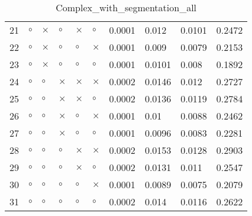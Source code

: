 \begin{table}[H]
\begin{tabular}{|P{0.7cm}|P{1.3cm}P{1.3cm}P{1.3cm}P{1.3cm}P{1.3cm}|P{1.1cm}P{1.1cm}P{1.1cm}P{1.1cm}|}
  21 &  $\circ$ & $\times$ &  $\circ$ &     $\times$ &     $\circ$ &       0.0001 &           0.012 &          0.0101 &          0.2472 \\
  22 &  $\circ$ & $\times$ &  $\circ$ &      $\circ$ &    $\times$ &       0.0001 &           0.009 &          0.0079 &          0.2153 \\
  23 &  $\circ$ & $\times$ &  $\circ$ &      $\circ$ &     $\circ$ &       0.0001 &          0.0101 &           0.008 &          0.1892 \\
  24 &  $\circ$ &  $\circ$ & $\times$ &     $\times$ &    $\times$ &       0.0002 &          0.0146 &           0.012 &          0.2727 \\
  25 &  $\circ$ &  $\circ$ & $\times$ &     $\times$ &     $\circ$ &       0.0002 &          0.0136 &          0.0119 &          0.2784 \\
  26 &  $\circ$ &  $\circ$ & $\times$ &      $\circ$ &    $\times$ &       0.0001 &            0.01 &          0.0088 &          0.2462 \\
  27 &  $\circ$ &  $\circ$ & $\times$ &      $\circ$ &     $\circ$ &       0.0001 &          0.0096 &          0.0083 &          0.2281 \\
  28 &  $\circ$ &  $\circ$ &  $\circ$ &     $\times$ &    $\times$ &       0.0002 &          0.0153 &          0.0128 &          0.2903 \\
  29 &  $\circ$ &  $\circ$ &  $\circ$ &     $\times$ &     $\circ$ &       0.0002 &          0.0131 &           0.011 &          0.2547 \\
  30 &  $\circ$ &  $\circ$ &  $\circ$ &      $\circ$ &    $\times$ &       0.0001 &          0.0089 &          0.0075 &          0.2079 \\
  31 &  $\circ$ &  $\circ$ &  $\circ$ &      $\circ$ &     $\circ$ &       0.0002 &           0.014 &          0.0116 &          0.2622 \\
\hline
\end{tabular}
\caption{Complex_with_segmentation_all}
\label{tab:}
\end{table}

